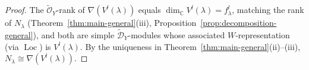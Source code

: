 \documentclass[10pt,a4paper]{amsart}
\begin{document}
\begin{proof}
The $\widetilde{\mathcal{O}}_Y$-rank of
$\nabla(V^l(\lambda))$ equals $\dim_{\mathbb{C}} V^l(\lambda) = f^l_\lambda$,
matching the rank of $N_\lambda$ (Theorem~\ref{thm:main-general}(iii),
Proposition~\ref{prop:decomposition-general}), and both are simple
$\widetilde{\mathcal{D}}_Y$-modules whose associated $W$-representation
(via $\operatorname{Loc}$) is $V^l(\lambda)$. By the uniqueness in
Theorem~\ref{thm:main-general}(ii)--(iii), $N_\lambda \cong \nabla(V^l(\lambda))$.
\end{proof}
\end{document}

